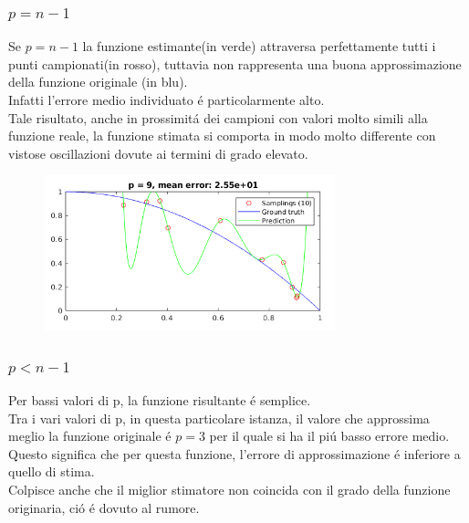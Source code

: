 \documentclass[12pt]{article}
\begin{document}
\subsubsection{$p=n-1$}
Se $p=n-1$ la funzione estimante(in verde) attraversa perfettamente tutti i punti campionati(in rosso),
tuttavia non rappresenta una buona approssimazione della funzione originale (in blu). \\
Infatti l'errore medio individuato é particolarmente alto. \\
Tale risultato, anche in prossimitá dei campioni con valori molto simili alla funzione reale,
la funzione stimata si comporta in modo molto differente con vistose oscillazioni dovute ai termini di grado elevato.

\begin{figure}[H]
  \centering
  \includegraphics[width=0.75\textwidth]{plots/regression/maximum_p.png}
\end{figure}

\subsubsection{$p<n-1$}

Per bassi valori di p, la funzione risultante é semplice. \\
Tra i vari valori di p, in questa particolare istanza,
il valore che approssima meglio la funzione originale é $p=3$
per il quale si ha il piú basso errore medio. \\
Questo significa che per questa funzione,
l'errore di approssimazione é inferiore a quello di stima. \\
Colpisce anche che il miglior stimatore non coincida con il grado della funzione originaria,
ció é dovuto al rumore. \\
\end{document}

